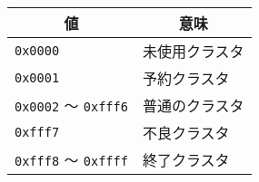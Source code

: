 \documentclass{standalone}
\def\|{\verb|} %|
\begin{document}
                                   
\begin{tabular}{ l | l }\hline\hline
  \multicolumn{1}{c|}{値} &
  \multicolumn{1}{c}{意味} \\\hline
  \|0x0000|               & 未使用クラスタ \\
  \|0x0001|               & 予約クラスタ   \\
  \|0x0002| 〜 \|0xfff6|  & 普通のクラスタ \\
  \|0xfff7|               & 不良クラスタ   \\
  \|0xfff8| 〜 \|0xffff|  & 終了クラスタ   \\
\end{tabular}
\end{document}

